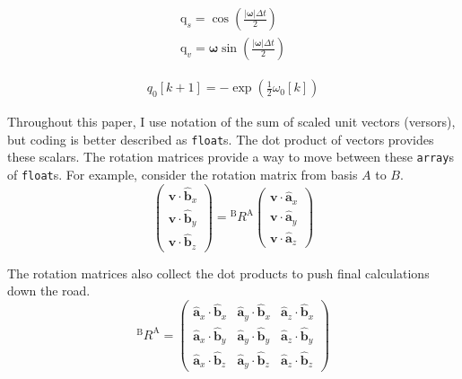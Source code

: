\documentclass[lettersize,journal]{IEEEtran}
\begin{document}
\begin{eqnarray}
	\mathrm{q}_s = \cos\left(\frac{\left|\boldsymbol\omega\right|\Delta t}{2}\right)\nonumber\\
	\mathrm{q}_v = \boldsymbol\omega \sin\left(\frac{\left|\boldsymbol\omega\right|\Delta t}{2}\right) \nonumber
\end{eqnarray}

\begin{eqnarray}
  q_0[k+1] = -\exp\left(\frac{1}{2} \omega_0[k] \right)
\end{eqnarray}



Throughout this paper, I use notation of the sum of scaled unit vectors (versors), but coding is better described as \texttt{float}s. The dot product of vectors provides these scalars. The rotation matrices provide a way to move between these \texttt{array}s of \texttt{float}s. For example, consider the rotation matrix from basis $A$ to $B$.
\begin{equation}
  \begin{pmatrix}
    \mathbf{v} \cdot \mathbf{\hat{b}}_x \\
    \mathbf{v} \cdot \mathbf{\hat{b}}_y \\
    \mathbf{v} \cdot \mathbf{\hat{b}}_z
  \end{pmatrix}
  =
  {^\mathrm{B}R^\mathrm{A}}
  \begin{pmatrix}
    \mathbf{v} \cdot \mathbf{\hat{a}}_x \\
    \mathbf{v} \cdot \mathbf{\hat{a}}_y \\
    \mathbf{v} \cdot \mathbf{\hat{a}}_z
  \end{pmatrix}
\end{equation}

The rotation matrices also collect the dot products to push final calculations down the road.
\begin{equation}
  {^\mathrm{B}R^\mathrm{A}} = 
  \begin{pmatrix}
    \mathbf{\hat{a}}_x \cdot \mathbf{\hat{b}}_x &
    \mathbf{\hat{a}}_y \cdot \mathbf{\hat{b}}_x &
    \mathbf{\hat{a}}_z \cdot \mathbf{\hat{b}}_x \\
    \mathbf{\hat{a}}_x \cdot \mathbf{\hat{b}}_y &
    \mathbf{\hat{a}}_y \cdot \mathbf{\hat{b}}_y &
    \mathbf{\hat{a}}_z \cdot \mathbf{\hat{b}}_y \\
    \mathbf{\hat{a}}_x \cdot \mathbf{\hat{b}}_z &
    \mathbf{\hat{a}}_y \cdot \mathbf{\hat{b}}_z &
    \mathbf{\hat{a}}_z \cdot \mathbf{\hat{b}}_z
  \end{pmatrix}
\end{equation}
\end{document}
